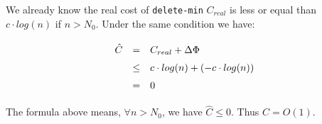 We already know the real cost of \texttt{delete-min} $C_{real}$ is less or equal than $c \cdot log(n)$ if $n > N_{0}$. Under the same condition we have:

\[
\def\arraystretch{1.5}
\begin{array}{lcl}
\hat C & = & C_{real} + \Delta \Phi \\
       & \leq & c \cdot log(n) + (- c \cdot log(n)) \\
       & = & 0
\end{array}
\]

The formula above means, $\forall n > N_0$, we have $\hat C \leq 0$. Thus $\hat C = O(1)$.

